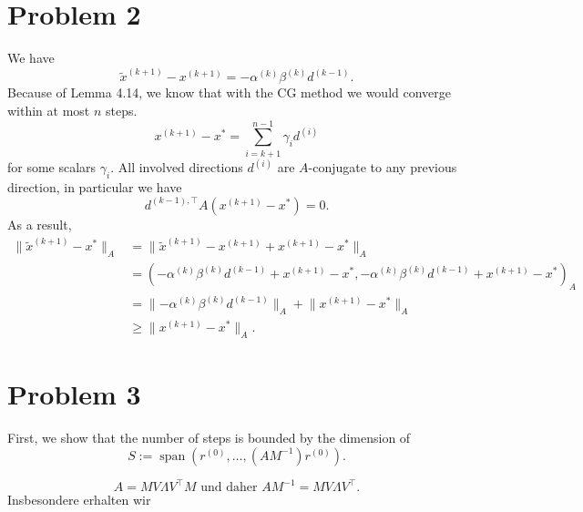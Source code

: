 \documentclass{article}
\begin{document}
    \section*{Problem 2}
    We have
    \[
        \tilde x^{(k+1)} - x^{(k+1)} = - \alpha^{(k)}\beta^{(k)}d^{(k-1)}.
    \]
    Because of Lemma 4.14, we know that with the CG method we would converge within at most $n$ steps. 
    \[
        x^{(k+1)} - x^*= \sum_{i=k+1}^{n-1} \gamma_i d^{(i)}
    \]
    for some scalars $\gamma_i$. All involved directions $d^{(i)}$ are $A$-conjugate to any previous direction, in particular we have 
    \[
        d^{(k-1), \top} A \left(x^{(k+1)} - x^*\right) = 0.
    \]
    As a result,
    \begin{align*}
        \lVert \tilde x^{(k+1)} - x^* \rVert _A 
        &= \lVert \tilde x^{(k+1)} - x^{(k+1)} + x^{(k+1)} - x^* \rVert _A\\
        &= \left(- \alpha^{(k)}\beta^{(k)}d^{(k-1)} + x^{(k+1)} - x^* , - \alpha^{(k)}\beta^{(k)}d^{(k-1)} + x^{(k+1)} - x^*\right) _A\\
        &= \lVert - \alpha^{(k)}\beta^{(k)}d^{(k-1)}\rVert _A + \lVert x^{(k+1)} - x^*\rVert _A\\
        &\geq \lVert x^{(k+1)} - x^*\rVert _A.
    \end{align*}
    \section*{Problem 3}
    First, we show that the number of steps is bounded by the dimension of
    \[
        S := \operatorname*{span}\left(r^{(0)}, \dots, (AM^{-1})r^{(0)}\right).  
    \]
    
    \[
        A = MV\Lambda V^\top M \text{ und daher } AM^{-1} = MV\Lambda V^\top.  
    \]
    Insbesondere erhalten wir 
\end{document}
